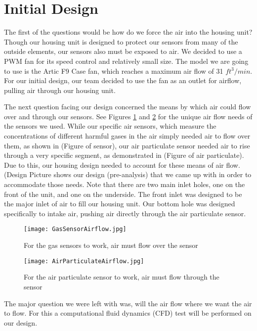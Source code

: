 \section{Initial Design}

The first of the questions would be how do we force the air into the housing unit? Though our housing unit is designed to protect our sensors from many of the outside elements, our sensors also must be exposed to air. We decided to use a PWM fan for its speed control and relatively small size. The model we are going to use is the Artic F9 Case fan, which reaches a maximum air flow of 31 $ft^{3}/min$. For our initial design, our team decided to use the fan as an outlet for airflow, pulling air through our housing unit.

The next question facing our design concerned the means by which air could flow over and through our sensors. See Figures \ref{fig:airflow1} and \ref{fig:airflow2} for the unique air flow needs of the sensors we used. While our specific air sensors, which measure the concentrations of different harmful gases in the air simply needed air to flow over them, as shown in (Figure of sensor), our air particulate sensor needed air to rise through a very specific segment, as demonstrated in (Figure of air particulate). Due to this, our housing design needed to account for these means of air flow. (Design Picture shows our design (pre-analysis) that we came up with in order to accommodate those needs. Note that there are two main inlet holes, one on the front of the unit, and one on the underside. The front inlet was designed to be the major inlet of air to fill  our housing unit. Our bottom hole was designed specifically to intake air, pushing air directly through the air particulate sensor.

\begin{figure}[H]
	\centering
	\texttt{[image: GasSensorAirflow.jpg]}
	\caption{For the gas sensors to work, air must flow over the sensor}
	\label{fig:airflow1}
\end{figure}

\begin{figure}[H]
	\centering
	\texttt{[image: AirParticulateAirflow.jpg]}
	\caption{For the air particulate sensor to work, air must flow through the sensor}
	\label{fig:airflow2}
\end{figure}

The major question we were left with was, will the air flow where we want the air to flow. For this a computational fluid dynamics (CFD) test will be performed on our design.

